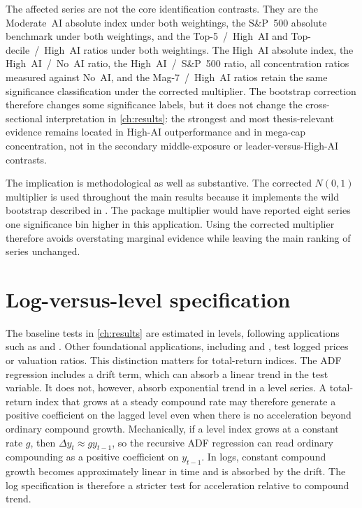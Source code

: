 The affected series are not the core identification contrasts. They are the Moderate~AI absolute index under both weightings, the S\&P~500 absolute benchmark under both weightings, and the Top-5~/~High~AI and Top-decile~/~High~AI ratios under both weightings. The High~AI absolute index, the High~AI~/~No~AI ratio, the High~AI~/~S\&P~500 ratio, all concentration ratios measured against No~AI, and the Mag-7~/~High~AI ratios retain the same significance classification under the corrected multiplier. The bootstrap correction therefore changes some significance labels, but it does not change the cross-sectional interpretation in \cref{ch:results}: the strongest and most thesis-relevant evidence remains located in High-AI outperformance and in mega-cap concentration, not in the secondary middle-exposure or leader-versus-High-AI contrasts.

The implication is methodological as well as substantive. The corrected $N(0,1)$ multiplier is used throughout the main results because it implements the wild bootstrap described in \citet{harveyEtAl2016}. The package multiplier would have reported eight series one significance bin higher in this application. Using the corrected multiplier therefore avoids overstating marginal evidence while leaving the main ranking of series unchanged.


\section{Log-versus-level specification}
\label{sec:rob-log}

The baseline tests in \cref{ch:results} are estimated in levels, following applications such as \citet{baselePhillipsShi2025} and \citet{caspiPhillipsShi2018}. Other foundational applications, including \citet{phillipsWuYu2011} and \citet{phillipsShiYu2015a}, test logged prices or valuation ratios. This distinction matters for total-return indices. The ADF regression includes a drift term, which can absorb a linear trend in the test variable. It does not, however, absorb exponential trend in a level series. A total-return index that grows at a steady compound rate may therefore generate a positive coefficient on the lagged level even when there is no acceleration beyond ordinary compound growth. Mechanically, if a level index grows at a constant rate $g$, then $\Delta y_t \approx g y_{t-1}$, so the recursive ADF regression can read ordinary compounding as a positive coefficient on $y_{t-1}$. In logs, constant compound growth becomes approximately linear in time and is absorbed by the drift. The log specification is therefore a stricter test for acceleration relative to compound trend.

